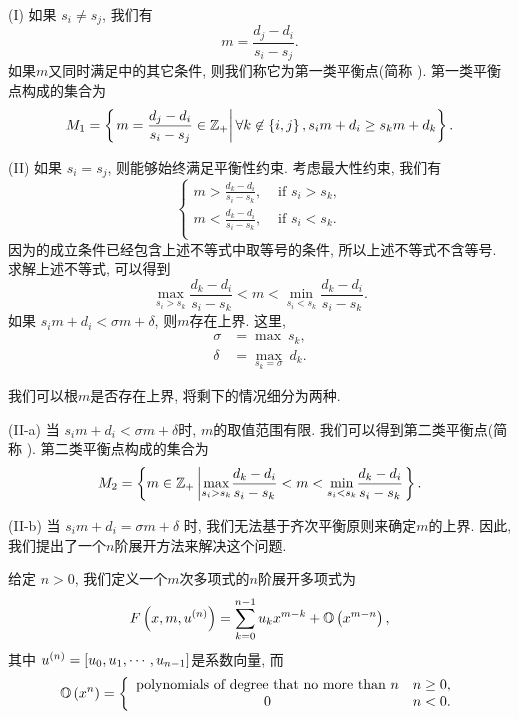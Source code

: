 (I) 如果 $s_i \neq s_j$, 我们有 
\begin{equation}
m=\frac{d_j-d_i}{s_i-s_j}.
\end{equation}
如果$m$又同时满足中的其它条件, 则我们称它为第一类平衡点(简称 \BPone{}). 第一类平衡点构成的集合为 
\begin{equation}
M_1=\left\{\left. m=\frac{d_j-d_i}{s_i-s_j}\in \mathbb Z_+\right\vert \forall k\not\in \left\{i,j\right\}, s_i m+d_i\ge s_k m+d_k\right\}.
\end{equation}

(II) 如果 $s_i = s_j$, 则能够始终满足平衡性约束. 考虑最大性约束, 我们有 
\begin{equation}
\left\{
\begin{split}
m > \frac{d_k-d_i}{s_i-s_k}, & \text{ if } s_i>s_k,  \\
m < \frac{d_k-d_i}{s_i-s_k}, & \text{ if } s_i<s_k.  \\
\end{split}
\right.
\end{equation}
因为\BPone{}的成立条件已经包含上述不等式中取等号的条件, 所以上述不等式不含等号. 求解上述不等式, 可以得到 
\begin{equation}
\underset{s_i>s_k}{\max}{\frac{d_k-d_i}{s_i-s_k}} < m < \underset{s_i<s_k}{\min}{\frac{d_k-d_i}{s_i-s_k}}.
\end{equation}
如果 $s_i m + d_i < \sigma m + \delta$, 则$m$存在上界. 这里, 
\begin{equation}
\begin{split}
\sigma &= \max ~s_k,  \\
\delta &= \underset{s_k=\sigma}{\max}{~d_k}.
\end{split}
\label{eq-max-sd}
\end{equation}

我们可以根$m$是否存在上界, 将剩下的情况细分为两种. 

(II-a) 当 $s_i m + d_i < \sigma m + \delta$时, $m$的取值范围有限. 我们可以得到第二类平衡点(简称 \BPtwo{}). 第二类平衡点构成的集合为
\begin{equation}
M_2=\left\{m\in \mathbb Z_+\left|\underset{s_i>s_k}{\max}{\frac{d_k-d_i}{s_i-s_k}} < m < \underset{s_i<s_k}{\min}{\frac{d_k-d_i}{s_i-s_k}}\right.\right\} .
\end{equation}

(II-b) 当 $s_i m + d_i = \sigma m + \delta$ 时, 我们无法基于齐次平衡原则来确定$m$的上界. 因此, 我们提出了一个$n$阶展开方法来解决这个问题.

给定 $n>0$, 我们定义一个$m$次多项式的$n$阶展开多项式为
\begin{equation}
F\left(x,m,u^{(n)}\right)=\sum_{k=0}^{n-1}{u_k x^{m-k}}+\mathbb O\left(x^{m-n}\right),
\label{npoly}
\end{equation}
其中 $u^{(n)}=\left[u_0,u_1,\cdots,u_{n-1}\right]$是系数向量, 而
\begin{equation}
\mathbb O\left(x^n\right)=\left\{
\begin{array}{cl}
\text{polynomials of degree that no more than } n & n\ge 0, \\
0                                                 & n<0 .
\end{array}
\right.
\end{equation}


